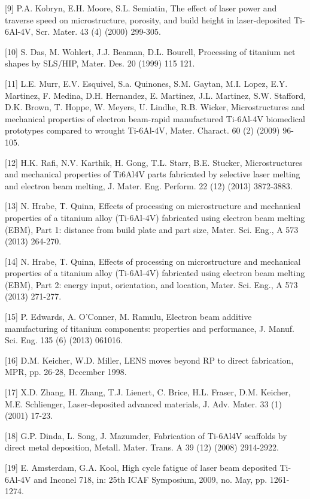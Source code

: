 \documentclass[10pt]{article}
\begin{document}
[9] P.A. Kobryn, E.H. Moore, S.L. Semiatin, The effect of laser power and traverse speed on microstructure, porosity, and build height in laser-deposited Ti-6Al-4V, Scr. Mater. 43 (4) (2000) 299-305.

[10] S. Das, M. Wohlert, J.J. Beaman, D.L. Bourell, Processing of titanium net shapes by SLS/HIP, Mater. Des. 20 (1999) 115 121.

[11] L.E. Murr, E.V. Esquivel, S.a. Quinones, S.M. Gaytan, M.I. Lopez, E.Y. Martinez, F. Medina, D.H. Hernandez, E. Martinez, J.L. Martinez, S.W. Stafford, D.K. Brown, T. Hoppe, W. Meyers, U. Lindhe, R.B. Wicker, Microstructures and mechanical properties of electron beam-rapid manufactured Ti-6Al-4V biomedical prototypes compared to wrought Ti-6Al-4V, Mater. Charact. 60 (2) (2009) 96-105.

[12] H.K. Rafi, N.V. Karthik, H. Gong, T.L. Starr, B.E. Stucker, Microstructures and mechanical properties of Ti6Al4V parts fabricated by selective laser melting and electron beam melting, J. Mater. Eng. Perform. 22 (12) (2013) 3872-3883.

[13] N. Hrabe, T. Quinn, Effects of processing on microstructure and mechanical properties of a titanium alloy (Ti-6Al-4V) fabricated using electron beam melting (EBM), Part 1: distance from build plate and part size, Mater. Sci. Eng., A 573 (2013) 264-270.

[14] N. Hrabe, T. Quinn, Effects of processing on microstructure and mechanical properties of a titanium alloy (Ti-6Al-4V) fabricated using electron beam melting (EBM), Part 2: energy input, orientation, and location, Mater. Sci. Eng., A 573 (2013) 271-277.

[15] P. Edwards, A. O'Conner, M. Ramulu, Electron beam additive manufacturing of titanium components: properties and performance, J. Manuf. Sci. Eng. 135 (6) (2013) 061016.

[16] D.M. Keicher, W.D. Miller, LENS moves beyond RP to direct fabrication, MPR, pp. 26-28, December 1998.

[17] X.D. Zhang, H. Zhang, T.J. Lienert, C. Brice, H.L. Fraser, D.M. Keicher, M.E. Schlienger, Laser-deposited advanced materials, J. Adv. Mater. 33 (1) (2001) 17-23.

[18] G.P. Dinda, L. Song, J. Mazumder, Fabrication of Ti-6Al4V scaffolds by direct metal deposition, Metall. Mater. Trans. A 39 (12) (2008) 2914-2922.

[19] E. Amsterdam, G.A. Kool, High cycle fatigue of laser beam deposited Ti-6Al-4V and Inconel 718, in: 25th ICAF Symposium, 2009, no. May, pp. 1261-1274.
\end{document}
